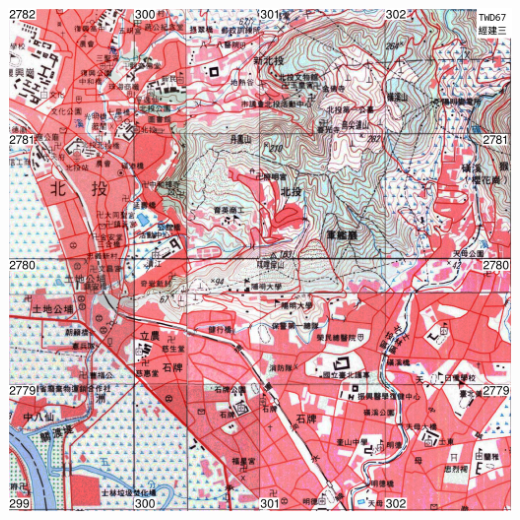 \documentclass[12pt,landscape]{article}
\begin{document}
\begin{multicols}{2}
\newpage
\includegraphics[width=41.46cm, height=33.16cm]{v3.png}
\end{multicols}
\end{document}
